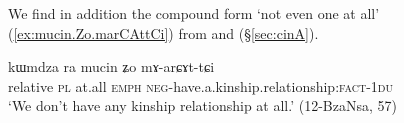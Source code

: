 We find in addition the compound form  `not even one at all' (\ref{ex:mucin.Zo.marCAttCi}) from  and   (§\ref{sec:cinA}).

\begin{exe}
	\ex \label{ex:mucin.Zo.marCAttCi}
	\gll  kɯmdza ra mucin ʑo mɤ-arɕɤt-tɕi  \\
	relative \textsc{pl} at.all \textsc{emph} \textsc{neg}-have.a.kinship.relationship:\textsc{fact}-\textsc{1du} \\
	\glt `We don't have any kinship relationship at all.' (12-BzaNsa, 57)
\end{exe} 
